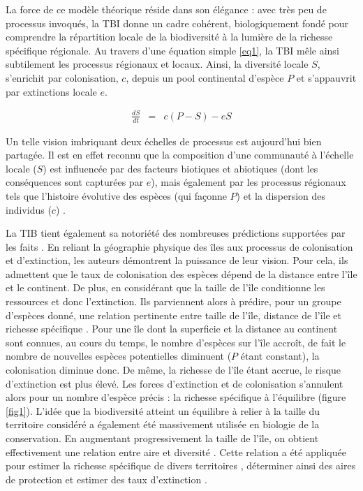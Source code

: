 La force de ce modèle théorique réside dans son élégance : avec très peu
de processus invoqués, la TBI donne un cadre cohérent, biologiquement
fondé pour comprendre la répartition locale de la biodiversité à la
lumière de la richesse spécifique régionale. Au travers d'une équation
simple \eqref{eq1}, la TBI mêle ainsi subtilement les processus
régionaux et locaux. Ainsi, la diversité locale \(S\), s'enrichit par
colonisation, \(c\), depuis un pool continental d'espèce \(P\) et
s'appauvrit par extinctions locale \(e\).

\begin{eqnarray}
\label{eq1} \frac{dS}{dt}&=&c(P-S)-eS
\end{eqnarray}

Un telle vision imbriquant deux échelles de processus est aujourd'hui
bien partagée. Il est en effet reconnu que la composition d'une
communauté à l'échelle locale (\(S\)) est influencée par des facteurs
biotiques et abiotiques (dont les conséquences sont capturées par
\(e\)), mais également par les processus régionaux tels que l'histoire
évolutive des espèces (qui façonne \(P\)) et la dispersion des individus
(\(c\)) \cite{Ricklefs1987,Leibold2004}.

La TIB tient également sa notoriété des nombreuses prédictions
supportées par les faits \cite{MacArthur1967}. En reliant la géographie
physique des îles aux processus de colonisation et d'extinction, les
auteurs démontrent la puissance de leur vision. Pour cela, ils admettent
que le taux de colonisation des espèces dépend de la distance entre
l'île et le continent. De plus, en considérant que la taille de l'île
conditionne les ressources et donc l'extinction. Ils parviennent alors à
prédire, pour un groupe d'espèces donné, une relation pertinente entre
taille de l'île, distance de l'île et richesse spécifique
\cite{MacArthur1967}. Pour une île dont la superficie et la distance au
continent sont connues, au cours du temps, le nombre d'espèces sur l'île
accroît, de fait le nombre de nouvelles espèces potentielles diminuent
(\(P\) étant constant), la colonisation diminue donc. De même, la
richesse de l'île étant accrue, le risque d'extinction est plus élevé.
Les forces d'extinction et de colonisation s'annulent alors pour un
nombre d'espèce précis : la richesse spécifique à l'équilibre (figure
\ref{fig1}). L'idée que la biodiversité atteint un équilibre à relier à
la taille du territoire considéré a également été massivement utilisée
en biologie de la conservation. En augmentant progressivement la taille
de l'île, on obtient effectivement une relation entre aire et diversité
\cite{MacArthur1967, Lomolino2000a}. Cette relation a été appliquée pour
estimer la richesse spécifique de divers territoires \cite{May1988},
déterminer ainsi des aires de protection \cite{Neigel2003,Desmet2004} et
estimer des taux d'extinction \cite{He2011}.

